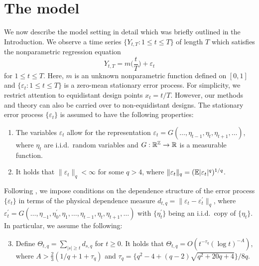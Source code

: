 
\section{The model}\label{sec-model}


We now describe the model setting in detail which was briefly outlined in the Introduction. We observe a time series $\{Y_{t,T}: 1 \le t \le T \}$ of length $T$ which satisfies the nonparametric regression equation 
\begin{equation}\label{model}
Y_{t,T} = m \Big( \frac{t}{T} \Big) + \varepsilon_t 
\end{equation}
for $1 \le t \le T$. Here, $m$ is an unknown nonparametric function defined on $[0,1]$ and $\{ \varepsilon_t: 1 \le t \le T \}$ is a zero-mean stationary error process. For simplicity, we restrict attention to equidistant design points $x_t = t/T$. However, our methods and theory can also be carried over to non-equidistant designs. The stationary error process $\{\varepsilon_t\}$ is assumed to have the following properties: 
\begin{enumerate}[label=(C\arabic*),leftmargin=1.05cm]

\item \label{C-err1} The variables $\varepsilon_t$ allow for the representation $\varepsilon_t = G(\ldots,\eta_{t-1},\eta_t,\eta_{t+1},\ldots)$, where $\eta_t$ are i.i.d.\ random variables and $G: \mathbb{R}^{\mathbb{Z}} \rightarrow \mathbb{R}$ is a measurable function. 

\item \label{C-err2} It holds that $\| \varepsilon_t \|_q < \infty$ for some $q > 4$, where $\| \varepsilon_t \|_q = (\mathbb{E}|\varepsilon_t|^q)^{1/q}$. 

\end{enumerate}
Following \cite{Wu2005}, we impose conditions on the dependence structure of the error process $\{\varepsilon_t\}$ in terms of the physical dependence measure $d_{t,q} = \| \varepsilon_t - \varepsilon_t^\prime \|_q$, where $\varepsilon_t^\prime = G(\ldots,\eta_{-1},\eta_0^\prime,\eta_1,\ldots,\eta_{t-1},\eta_t,\eta_{t+1},\ldots)$ with $\{\eta_t^\prime\}$ being an i.i.d.\ copy of $\{\eta_t\}$. In particular, we assume the following: 
\begin{enumerate}[label=(C\arabic*),leftmargin=1.05cm]
\setcounter{enumi}{2}

\item \label{C-err3} Define $\Theta_{t,q} = \sum\nolimits_{|s| \ge t} d_{s,q}$ for $t \ge 0$. It holds that 
$\Theta_{t,q} = O ( t^{-\tau_q} (\log t)^{-A} )$,  
where $A > \frac{2}{3} (1/q + 1 + \tau_q)$ and $\tau_q = \{q^2 - 4 + (q-2) \sqrt{q^2 + 20q + 4}\} / 8q$. 

\end{enumerate}
